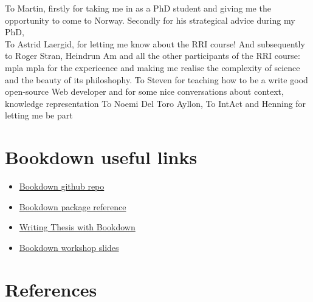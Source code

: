\documentclass[
  12pt,
]{book}
\providecommand{\tightlist}{%
  \setlength{\itemsep}{0pt}\setlength{\parskip}{0pt}}
\begin{document}
To Martin, firstly for taking me in as a PhD student and giving me the opportunity to come to Norway. Secondly for his strategical advice during my PhD,\\
To Astrid Laergid, for letting me know about the RRI course!
And subsequently to Roger Stran, Heindrun Am and all the other participants of the RRI course: mpla mpla for the expericence and making me realise the complexity of science and the beauty of its philoshophy.
To Steven for teaching how to be a write good open-source Web developer and for some nice conversations about context, knowledge representation
To Noemi Del Toro Ayllon,
To IntAct and Henning for letting me be part

\hypertarget{appendix-appendix}{%
\appendix}


\hypertarget{bookdown-useful-links}{%
\chapter*{Bookdown useful links}\label{bookdown-useful-links}}

\begin{itemize}
\tightlist
\item
  \href{https://github.com/rstudio/bookdown/}{Bookdown github repo}
\item
  \href{https://bookdown.org/yihui/bookdown/}{Bookdown package reference}
\item
  \href{https://eddjberry.netlify.com/post/writing-your-thesis-with-bookdown/}{Writing Thesis with Bookdown}
\item
  \href{https://arm.rbind.io/slides/bookdown.html}{Bookdown workshop slides}
\end{itemize}

\hypertarget{references}{%
\chapter*{References}\label{references}}
\end{document}
